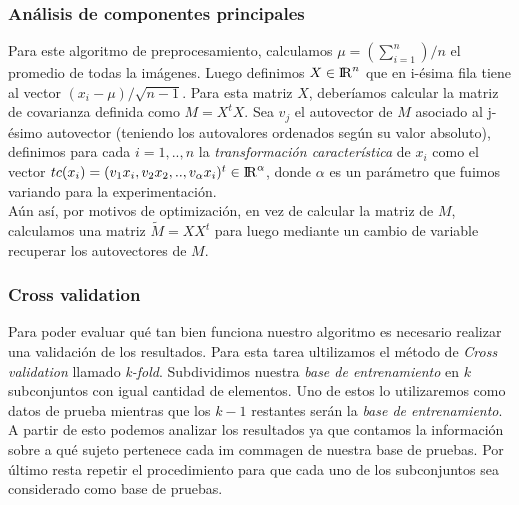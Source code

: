 \subsubsection*{An\'alisis de componentes principales}
\par Para este algoritmo de preprocesamiento, calculamos $\mu = (\sum_{i=1}^{n})/n$ el promedio de todas la im\'agenes. Luego definimos $X \in {\rm I\!R}^n$ 
que en i-\'esima fila tiene al vector $(x_i -  \mu)/\sqrt{n -1}$. Para esta matriz $X$, deber\'iamos calcular la matriz de covarianza definida como $M = X^tX$.
Sea $v_j$ el autovector de $M$ asociado al j-\'esimo autovector (teniendo los autovalores ordenados seg\'un su valor absoluto), definimos para cada
$i = 1,..,n$ la \textit{transformaci\'on caracter\'istica} de $x_i$ como el vector $tc(x_i) = (v_1x_i,v_2x_2,..,v_\alpha x_i)^t \in {\rm I\!R}^\alpha$,
donde $\alpha$ es un par\'ametro que fuimos variando para la experimentaci\'on.\\
A\'un as\'i, por motivos de optimizaci\'on, en vez de calcular la matriz de $M$, calculamos una matriz $\tilde{M} = XX^t$ para luego mediante un cambio de variable
recuperar los autovectores de $M$.

\subsubsection*{Cross validation} 
\par Para poder evaluar qu\'e tan bien funciona nuestro algoritmo es necesario realizar una validaci\'on de los resultados. Para esta tarea ultilizamos el
m\'etodo de \textit{Cross validation} llamado \textit{k-fold}. Subdividimos nuestra \textit{base de entrenamiento} en $k$ subconjuntos con igual cantidad
de elementos. Uno de estos lo utilizaremos como datos de prueba mientras que los $k-1$ restantes ser\'an la \textit{base de entrenamiento}. A partir de esto
podemos analizar los resultados ya que contamos la informaci\'on sobre a qu\'e sujeto pertenece cada im commagen de nuestra base de pruebas. Por \'ultimo resta repetir
el procedimiento para que cada uno de los subconjuntos sea considerado como base de pruebas.


